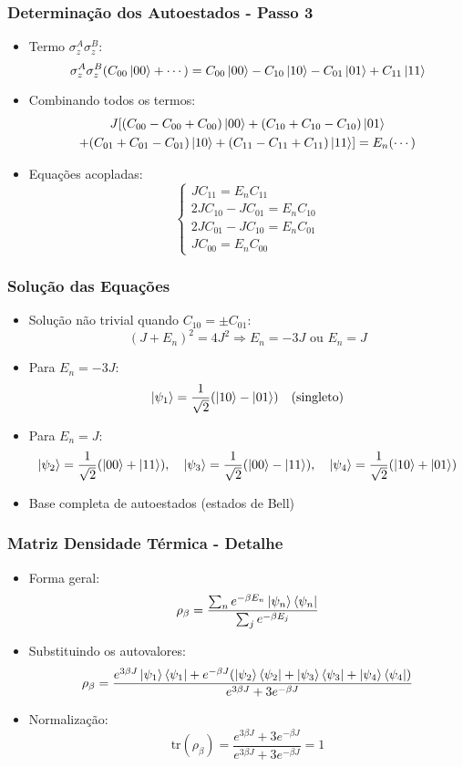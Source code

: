 \documentclass{beamer}
\begin{document}
	\begin{frame}
		\frametitle{Determinação dos Autoestados - Passo 3}
		\begin{itemize}
			\item Termo $\sigma_z^A \sigma_z^B$:
			\[
			\sigma_z^A \sigma_z^B (C_{00}\ket{00} + \cdots) = C_{00}\ket{00} - C_{10}\ket{10} - C_{01}\ket{01} + C_{11}\ket{11}
			\]
			\item Combinando todos os termos:
			\begin{multline*}
				J[(C_{00} - C_{00} + C_{00})\ket{00} + (C_{10} + C_{10} - C_{10})\ket{01} \\
				+ (C_{01} + C_{01} - C_{01})\ket{10} + (C_{11} - C_{11} + C_{11})\ket{11}] = E_n (\cdots)
			\end{multline*}
			\item Equações acopladas:
			\[
			\begin{cases}
				J C_{11} = E_n C_{11} \\
				2J C_{10} - J C_{01} = E_n C_{10} \\
				2J C_{01} - J C_{10} = E_n C_{01} \\
				J C_{00} = E_n C_{00}
			\end{cases}
			\]
		\end{itemize}
	\end{frame}
	
	\begin{frame}
		\frametitle{Solução das Equações}
		\begin{itemize}
			\item Solução não trivial quando $C_{10} = \pm C_{01}$:
			\[
			(J + E_n)^2 = 4J^2 \Rightarrow E_n = -3J \text{ ou } E_n = J
			\]
			\item Para $E_n = -3J$:
			\[
			\ket{\psi_1} = \frac{1}{\sqrt{2}}(\ket{10} - \ket{01}) \quad \text{(singleto)}
			\]
			\item Para $E_n = J$:
			\[
			\ket{\psi_2} = \frac{1}{\sqrt{2}}(\ket{00} + \ket{11}), \quad \ket{\psi_3} = \frac{1}{\sqrt{2}}(\ket{00} - \ket{11}), \quad \ket{\psi_4} = \frac{1}{\sqrt{2}}(\ket{10} + \ket{01})
			\]
			\item Base completa de autoestados (estados de Bell)
		\end{itemize}
	\end{frame}
	
	\begin{frame}
		\frametitle{Matriz Densidade Térmica - Detalhe}
		\begin{itemize}
			\item Forma geral:
			\[
			\rho_\beta = \frac{\sum_n e^{-\beta E_n} \ket{\psi_n}\bra{\psi_n}}{\sum_j e^{-\beta E_j}}
			\]
			\item Substituindo os autovalores:
			\[
			\rho_\beta = \frac{e^{3\beta J}\ket{\psi_1}\bra{\psi_1} + e^{-\beta J}(\ket{\psi_2}\bra{\psi_2} + \ket{\psi_3}\bra{\psi_3} + \ket{\psi_4}\bra{\psi_4})}{e^{3\beta J} + 3e^{-\beta J}}
			\]
			\item Normalização:
			\[
			\text{tr}(\rho_\beta) = \frac{e^{3\beta J} + 3e^{-\beta J}}{e^{3\beta J} + 3e^{-\beta J}} = 1
			\]
		\end{itemize}
	\end{frame}
	
\end{document}
